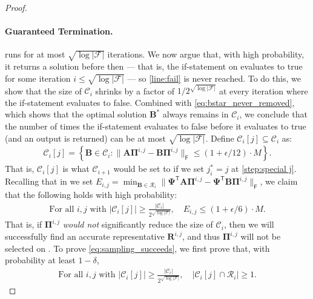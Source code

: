 \documentclass{article}[11pt]
\theoremstyle{definition}
\newcommand{\bv}[1]{\boldsymbol{\mathbf{#1}}}
\newcommand{\T}{\mathsf{T}}
\newcommand{\Fro}{\mathsf{F}}
\newcommand{\F}{\mathcal{F}}
\begin{document}
\begin{proof}
        \paragraph{Guaranteed Termination.}
         runs for at most $\sqrt{\log|\F|}$ iterations.
        We now argue that, with high probability, it returns a solution before then --- that is, the if-statement on  evaluates to true for some iteration $i \le \sqrt{\log |\F|}$ --- so \cref{line:fail} is never reached.
        To do this, we show that the size of $\mathcal{C}_i$ shrinks by a factor of $1/2^{\sqrt{\log|\F|}}$ at every iteration where the if-statement evaluates to false. Combined with \eqref{eq:bstar_never_removed}, which shows that the optimal solution $\bv{B}^*$ always remains in $\mathcal{C}_i$, we conclude that the number of times the if-statement evaluates to false before it evaluates to true (and an output is returned) can be at most $\sqrt{\log|\F|}$. 
        Define $\mathcal{C}_i[j]\subseteq \mathcal C_i$ as:
        \begin{align*}
            \mathcal{C}_i[j] = \left\{\bv{B} \in \mathcal{C}_{i} : \|\bv{A}\bv{\Pi}^{i,j} - \bv{B}\bv{\Pi}^{i,j}\|_\Fro \leq (1+\epsilon/12)\cdot M\right\}.
        \end{align*}
        That is, $\mathcal{C}_i[j]$
        is what $\mathcal{C}_{i+1}$ would be set to if we set $j_i^* = j$ at \cref{step:special j}. 
        Recalling that in  we set $E_{i,j} = \min_{\bv{B}\in \mathcal{R}_{i}} \|\bv{\Psi}^\T\bv{A}\bv{\Pi}^{i,j} - \bv{\Psi}^\T\bv{B}\bv{\Pi}^{i,j}\|_\Fro$, we claim that the following holds with high probability:
        \begin{align}
            \label{eq:sampling_succeeds}
            \text{For all } i, j \text{ with } |\mathcal{C}_{i}[j]| \geq \frac{|\mathcal{C}_{i}|}{2^{\sqrt{\log|\F|}}}, \quad E_{i,j} \leq (1+\epsilon/6)\cdot M.
        \end{align}
     That is, if $\bv{\Pi}^{i,j}$ \emph{would not} significantly reduce the size of $\mathcal{C}_{i}$, then we will successfully find an accurate representative $\bv{R}^{i,j}$, and thus $\bv{\Pi}^{i,j}$ will not be selected on . 
     To prove \eqref{eq:sampling_succeeds}, we first prove that, with probability at least $1-\delta$,
     \begin{align}\label{eq:allSamplesSucceed}
        \text{For all } i, j \text{ with } |\mathcal{C}_{i}[j]| \geq \frac{|\mathcal{C}_{i}|}{2^{\sqrt{\log|\F|}}},\quad |\mathcal C_i[j] \cap \mathcal{R}_i| \ge 1.

\end{align}
\end{proof}
\end{document}

